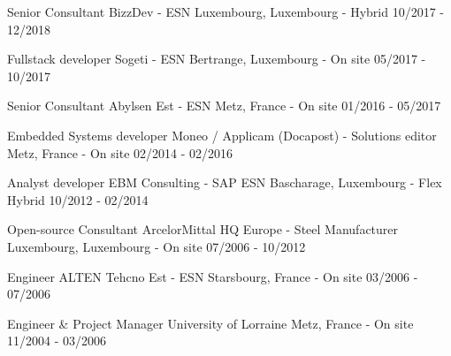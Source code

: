 \begin{cventries}
  \cventry
    {Senior Consultant} %
    {BizzDev - ESN} %
    {Luxembourg, Luxembourg - Hybrid} %
    {10/2017 - 12/2018} %
    {
    }

  \cventry
    {Fullstack developer} %
    {Sogeti - ESN} %
    {Bertrange, Luxembourg - On site} %
    {05/2017 - 10/2017} %
    {
    }

  \cventry
    {Senior Consultant} %
    {Abylsen Est - ESN} %
    {Metz, France - On site} %
    {01/2016 - 05/2017} %
    {
    }

  \cventry
    {Embedded Systems developer} %
    {Moneo / Applicam (Docapost) - Solutions editor} %
    {Metz, France - On site} %
    {02/2014 - 02/2016} %
    {
    }

  \cventry
    {Analyst developer} %
    {EBM Consulting - SAP ESN} %
    {Bascharage, Luxembourg - Flex Hybrid} %
    {10/2012 - 02/2014} %
    {
    }

  \cventry
    {Open-source Consultant} %
    {ArcelorMittal HQ Europe - Steel Manufacturer} %
    {Luxembourg, Luxembourg - On site} %
    {07/2006 - 10/2012} %
    {
    }

  \cventry
    {Engineer} %
    {ALTEN Tehcno Est - ESN} %
    {Starsbourg, France - On site} %
    {03/2006 - 07/2006} %
    {
    }

  \cventry
    {Engineer \& Project Manager} %
    {University of Lorraine} %
    {Metz, France - On site} %
    {11/2004 - 03/2006} %
    {
    }

\end{cventries}